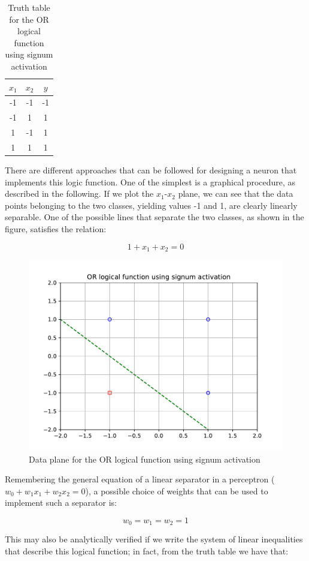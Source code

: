 \documentclass[letterpaper,headings=standardclasses]{scrartcl}
\begin{document}
\begin{table}[H]
\centering
\begin{tabular}{|c|c|c|}
\hline
$x_1$ & $x_2$ & $y$  \\ \hline
-1    & -1    & -1   \\ \hline
-1    & 1     & 1    \\ \hline
1     & -1    & 1    \\ \hline
1     & 1     & 1    \\ \hline
\end{tabular}
\caption{Truth table for the OR logical function using signum activation}
\end{table}

There are different approaches that can be followed for designing a neuron that implements this logic function. One of the simplest is a graphical procedure, as described in the following. If we plot the $x_1$-$x_2$ plane, we can see that the data points belonging to the two classes, yielding values -1 and 1, are clearly linearly separable. One of the possible lines that separate the two classes, as shown in the figure, satisfies the relation:

$$ 1 + x_1 + x_2 = 0 $$

\begin{figure}[H]
\centering
\includegraphics[width=.75\linewidth]{or_func.pdf}
\caption{Data plane for the OR logical function using signum activation}
\end{figure}

Remembering the general equation of a linear separator in a perceptron ($ w_0 + w_1x_1 + w_2x_2 = 0 $), a possible choice of weights that can be used to implement such a separator is:

$$ w_0 = w_1 = w_2 = 1 $$

This may also be analytically verified if we write the system of linear inequalities that describe this logical function; in fact, from the truth table we have that:
\end{document}
